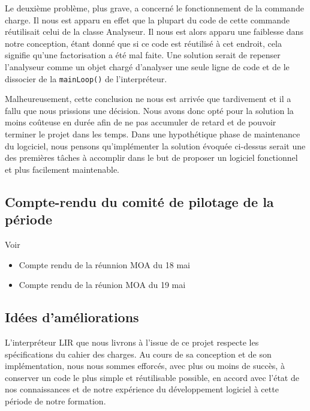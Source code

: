 \documentclass[12pt,a4paper,titlepage,openany, oneside]{report}
\begin{document}
    Le deuxième problème, plus grave, a concerné le fonctionnement de la commande charge.
    Il nous est apparu en effet que la plupart du code de cette commande réutilisait celui
    de la classe Analyseur. Il nous est alors apparu une faiblesse dans notre conception,
    étant donné que si ce code est réutilisé à cet endroit, cela signifie qu'une
    factorisation a été mal faite. Une solution serait de repenser l'analyseur comme un
    objet chargé d'analyser une seule ligne de code et de le dissocier de la
    \verb|mainLoop()| de l'interpréteur.

    Malheureusement, cette conclusion ne nous est
    arrivée que tardivement et il a fallu que nous prissions une décision. Nous avons
    donc opté pour la solution la moins coûteuse en durée afin de ne pas accumuler de
    retard et de pouvoir terminer le projet dans les temps. Dans une hypothétique phase
    de maintenance du logciciel, nous pensons qu'implémenter la solution évoquée ci-dessus
    serait une des premières tâches à accomplir dans le but de proposer un logiciel
    fonctionnel et plus facilement maintenable.



    \subsection{Compte-rendu du comité de pilotage de la période}
        Voir
        \begin{itemize}
            \item Compte rendu de la réunnion MOA du 18 mai
            \item Compte rendu de la réunion MOA du 19 mai
        \end{itemize}

    \subsection{Idées d'améliorations}
        L'interpréteur LIR que nous livrons à l'issue de ce projet respecte les
        spécifications du cahier des charges. Au cours de sa conception et de son implémentation, nous nous
        sommes efforcés, avec plus ou moins de succès, à conserver un code le plus
        simple et réutilisable possible, en accord avec l'état de nos connaissances et
        de notre expérience du développement logiciel à cette période de notre formation.
\end{document}
